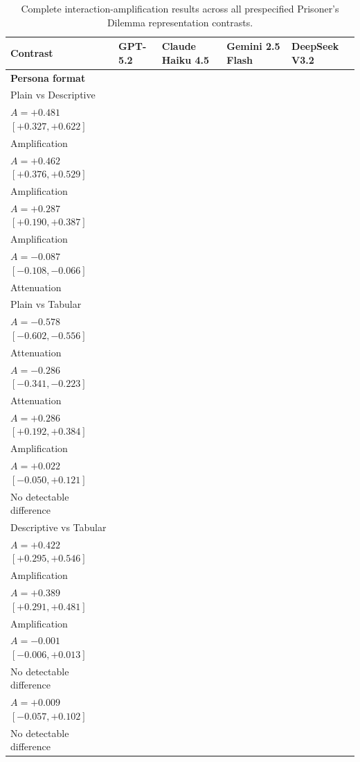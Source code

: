 \begin{table}[t]
\centering
\scriptsize
\setlength{\tabcolsep}{3pt}
\caption{Complete interaction-amplification results across all prespecified Prisoner's Dilemma representation contrasts.}
\label{tab:appendix-pd-complete-amplification}
\begin{tabular}{lp{3.35cm}p{3.35cm}p{3.35cm}p{3.35cm}}
\toprule
Contrast & GPT-5.2 & Claude Haiku 4.5 & Gemini 2.5 Flash & DeepSeek V3.2 \\
\midrule
\multicolumn{5}{l}{\textbf{Persona format}} \\
Plain vs Descriptive & \shortstack{$S_{\mathrm{fixed}}=0.271,\; S_{\mathrm{LLM}}=0.752$\\$A=+0.481$ $[+0.327, +0.622]$\\Amplification} & \shortstack{$S_{\mathrm{fixed}}=0.315,\; S_{\mathrm{LLM}}=0.777$\\$A=+0.462$ $[+0.376, +0.529]$\\Amplification} & \shortstack{$S_{\mathrm{fixed}}=0.070,\; S_{\mathrm{LLM}}=0.357$\\$A=+0.287$ $[+0.190, +0.387]$\\Amplification} & \shortstack{$S_{\mathrm{fixed}}=0.101,\; S_{\mathrm{LLM}}=0.013$\\$A=-0.087$ $[-0.108, -0.066]$\\Attenuation} \\
Plain vs Tabular & \shortstack{$S_{\mathrm{fixed}}=0.589,\; S_{\mathrm{LLM}}=0.012$\\$A=-0.578$ $[-0.602, -0.556]$\\Attenuation} & \shortstack{$S_{\mathrm{fixed}}=0.429,\; S_{\mathrm{LLM}}=0.143$\\$A=-0.286$ $[-0.341, -0.223]$\\Attenuation} & \shortstack{$S_{\mathrm{fixed}}=0.074,\; S_{\mathrm{LLM}}=0.360$\\$A=+0.286$ $[+0.192, +0.384]$\\Amplification} & \shortstack{$S_{\mathrm{fixed}}=0.055,\; S_{\mathrm{LLM}}=0.077$\\$A=+0.022$ $[-0.050, +0.121]$\\No detectable difference} \\
Descriptive vs Tabular & \shortstack{$S_{\mathrm{fixed}}=0.318,\; S_{\mathrm{LLM}}=0.740$\\$A=+0.422$ $[+0.295, +0.546]$\\Amplification} & \shortstack{$S_{\mathrm{fixed}}=0.244,\; S_{\mathrm{LLM}}=0.633$\\$A=+0.389$ $[+0.291, +0.481]$\\Amplification} & \shortstack{$S_{\mathrm{fixed}}=0.004,\; S_{\mathrm{LLM}}=0.003$\\$A=-0.001$ $[-0.006, +0.013]$\\No detectable difference} & \shortstack{$S_{\mathrm{fixed}}=0.054,\; S_{\mathrm{LLM}}=0.063$\\$A=+0.009$ $[-0.057, +0.102]$\\No detectable difference} \\

\end{tabular}
\end{table}
